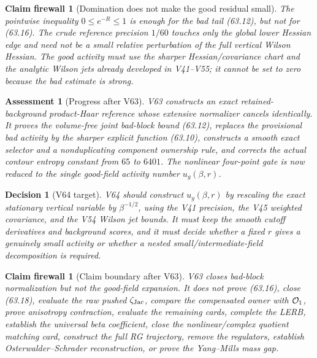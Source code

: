 \documentclass[11pt,oneside]{book}
\newtheorem{assessment}[theorem]{Assessment}
\newtheorem{firewall}[theorem]{Claim firewall}
\newtheorem{decision}[theorem]{Decision}
\theoremstyle{definition}
\theoremstyle{remark}
\begin{document}
\begin{firewall}[Domination does not make the good residual small]
\label{fire:e8v63-good-not-small}
The pointwise inequality \(0\le e^{-R}\le1\) is enough for the bad
tail (63.12), but not for (63.16).  The crude reference precision
\(1/60\) touches only the global lower Hessian edge and need not be a
small relative perturbation of the full vertical Wilson Hessian.
The good activity must use the sharper Hessian/covariance chart and
the analytic Wilson jets already developed in V41--V55; it cannot be
set to zero because the bad estimate is strong.
\end{firewall}

\begin{assessment}[Progress after V63]
\label{ass:e8v63-status}
V63 constructs an exact retained-background product-Haar reference
whose extensive normalizer cancels identically.  It proves the
volume-free joint bad-block bound (63.12), replaces the provisional
bad activity by the sharper explicit function (63.10), constructs a
smooth exact selector and a nonduplicating component ownership rule,
and corrects the actual contour entropy constant from \(65\) to
\(6401\).  The nonlinear four-point gate is now reduced to the single
good-field activity number \(u_g(\beta,r)\).
\end{assessment}

\begin{decision}[V64 target]
\label{dec:e8v63-next}
V64 should construct \(u_g(\beta,r)\) by rescaling the exact
stationary vertical variable by \(\beta^{-1/2}\), using the V41
precision, the V45 weighted covariance, and the V54 Wilson jet
bounds.  It must keep the smooth cutoff derivatives and background
scores, and it must decide whether a fixed \(r\) gives a genuinely
small activity or whether a nested small/intermediate-field
decomposition is required.
\end{decision}

\begin{firewall}[Claim boundary after V63]
\label{fire:e8v63-claim}
V63 closes bad-block normalization but not the good-field expansion.
It does not prove (63.16), close (63.18), evaluate the raw pushed
\(\zeta_{\rm Jac}\), compare the compensated owner with
\({\cal O}_1\), prove anisotropy contraction, evaluate the remaining
cards, complete the LERB, establish the universal beta coefficient,
close the nonlinear/complex quotient matching card, construct the
full RG trajectory, remove the regulators, establish
Osterwalder--Schrader reconstruction, or prove the Yang--Mills mass
gap.
\end{firewall}
\end{document}
